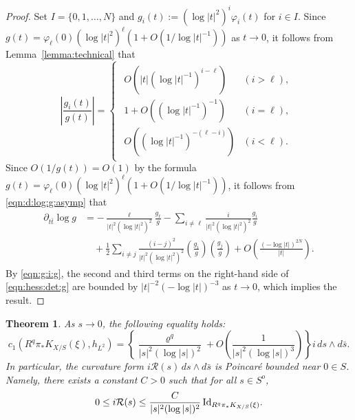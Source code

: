 \documentclass[amscd, leqno]{amsart}
\theoremstyle{plain}
\newtheorem{theorem}{Theorem}[section]
\theoremstyle{definition}
\theoremstyle{remark}
\newenvironment{pf}{\begin{proof}}{\end{proof}}
\begin{document}
\begin{pf}
Set $I=\{0,1,\ldots,N\}$ and $g_{i}(t):=(\log |t|^{2})^{i}\varphi_{i}(t)$ for $i\in I$. 
Since $g(t)=\varphi_{\ell}(0)( \log |t|^{2})^{\ell}(1+O(1/\log |t|^{-1}))$ as $t\to0$, it follows from Lemma~\ref{lemma:technical} that
\begin{equation}
\label{eqn:g:i:g}
\left|\frac{g_{i}(t)}{g(t)}\right|
=
\begin{cases}
\begin{array}{ll}
O(|t| (\log |t|^{-1})^{i-\ell})&(i>\ell),
\\
1+O((\log |t|^{-1})^{-1})&(i=\ell),
\\
O((\log |t|^{-1})^{-(\ell-i)})&(i<\ell).
\end{array}
\end{cases}
\end{equation}
Since $O(1/g(t))=O(1)$ by the formula $g(t)=\varphi_{\ell}(0)( \log |t|^{2})^{\ell}(1+O(1/\log |t|^{-1}))$, 
it follows from \eqref{eqn:d:log:g:asymp} that
\begin{equation}
\label{eqn:hess:det:g}
\begin{aligned}
\partial_{t\bar{t}}\log g
&=
-\frac{\ell}{|t|^{2}(\log|t|^{2})^{2}} \frac{g_{\ell}}{g} 
-
\sum_{i\not=\ell} \frac{i}{|t|^{2}(\log|t|^{2})^{2}} \frac{g_{i}}{g}
\\
&\quad
+\frac{1}{2}\sum_{i\not=j}
\frac{(i-j)^{2}}{|t|^{2}(\log|t|^{2})^{2}}
\left(\frac{g_{i}}{g}\right)\left(\frac{g_{j}}{g}\right)
+
O\left(\frac{(-\log|t|)^{2N}}{|t|}\right).
\end{aligned}
\end{equation}
By \eqref{eqn:g:i:g}, the second and third terms on the right-hand side of 
\eqref{eqn:hess:det:g} are bounded by $|t|^{-2}(-\log|t|)^{-3}$ as $t\to0$, which implies the result.
\end{pf}


\begin{theorem}
\label{thm:c1:dir:im:K}
As $s \to 0$, the following equality holds:
\begin{equation}
\label{eqn:Poincare:curv}
c_{1}(R^{q}\pi_{*}K_{X/S}(\xi),h_{L^{2}}) 
= \left\{ \frac{\varrho^{q}}{|s|^{2}(\log|s|)^{2}} + O\left(\frac{1}{|s|^{2}(\log|s|)^{3}}\right) \right\} i\,ds\wedge d\bar{s}.
\end{equation}
In particular, the curvature form $i{\mathcal R}(s)\,ds\wedge d\bar{s}$ is Poincar\'e bounded near $0\in S$. 
Namely, there exists a constant $C>0$ such that for all $s\in S^{o}$,
$$
0 \leq i{\mathcal R}(s) \leq \frac{C}{|s|^{2}(\log|s|)^{2}}\,{\rm Id}_{R^{q}\pi_{*}K_{X/S}(\xi)}.
$$
\end{theorem}
\end{document}

